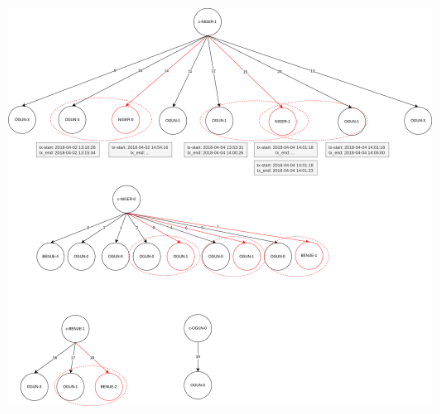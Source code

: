 \begin{graysection}
\begin{figure}[H]
  \hspace*{-2cm} 
  \includegraphics[scale=0.45]{images/2-QueryModel/FP1-test-1.1.png}
\end{figure}

\end{graysection}


